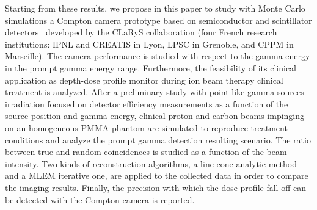 Starting from these results, we propose in this paper to study with Monte Carlo simulations a Compton camera prototype based on semiconductor and scintillator detectors~\cite{krimmer:hal-01101334} developed by the CLaRyS collaboration (four French research institutions: IPNL and CREATIS in Lyon, LPSC in Grenoble, and CPPM in Marseille). %
The camera performance is studied with respect to the gamma energy in the prompt gamma energy range. Furthermore, the feasibility of its clinical application as depth-dose profile monitor during ion beam therapy clinical treatment is analyzed. After a preliminary study with point-like gamma sources irradiation focused on detector efficiency measurements as a function of the source position and gamma energy, clinical proton and carbon beams impinging on an homogeneous PMMA phantom are simulated to reproduce treatment conditions and analyze the prompt gamma detection resulting scenario. The ratio between true and random coincidences is studied as a function of the beam intensity. Two kinds of reconstruction algorithms, a line-cone analytic method and a MLEM iterative one, are applied to the collected data in order to compare the imaging results. Finally, the precision with which the dose profile fall-off can be detected with the Compton camera is reported.   


